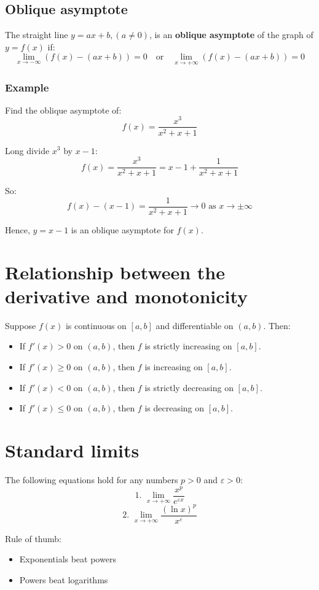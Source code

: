 \documentclass[11pt]{article}
\begin{document}
\newpage
\subsection{Oblique asymptote}
\label{sec:orgde6955f}
The straight line \(y = ax + b, (a \neq 0)\), is an \textbf{oblique asymptote} of the graph of \(y = f(x)\) if:
\[\lim_{x \rightarrow -\infty} (f(x) - (ax + b)) = 0 \quad \text{or} \quad \lim_{x \rightarrow +\infty} (f(x) - (ax + b)) = 0\]
\subsubsection{Example}
\label{sec:org05d23cc}
Find the oblique asymptote of:
\[f(x) = \frac{x^3}{x^2 + x + 1}\]

Long divide \(x^3\) by \(x - 1\):
\[f(x) = \frac{x^3}{x^2 + x + 1} = x - 1 + \frac{1}{x^2 + x + 1}\]

So:
\[f(x) - (x - 1) = \frac{1}{x^2 + x + 1} \rightarrow 0 \text{ as } x \rightarrow \pm \infty\]

Hence, \(y = x - 1\) is an oblique asymptote for \(f(x)\).
\section{Relationship between the derivative and monotonicity}
\label{sec:orgd80eaaf}
Suppose \(f(x)\) is continuous on \([a, b]\) and differentiable on \((a, b)\). Then:
\begin{itemize}
\item If \(f'(x) > 0\) on \((a, b)\), then \(f\) is strictly increasing on \([a, b]\).
\item If \(f'(x) \ge 0\) on \((a, b)\), then \(f\) is increasing on \([a, b]\).
\item If \(f'(x) < 0\) on \((a, b)\), then \(f\) is strictly decreasing on \([a, b]\).
\item If \(f'(x) \le 0\) on \((a, b)\), then \(f\) is decreasing on \([a, b]\).
\end{itemize}

\newpage
\section{Standard limits}
\label{sec:orge88b189}
The following equations hold for any numbers \(p > 0\) and \(\varepsilon > 0\):
\[\text{1. } \lim_{x \rightarrow +\infty} \frac{x^p}{e^{\varepsilon x}}\]
\[\text{2. } \lim_{x \rightarrow +\infty} \frac{(\ln x)^p}{x^{\varepsilon}}\]

Rule of thumb:
\begin{itemize}
\item Exponentials beat powers
\item Powers beat logarithms
\end{itemize}
\end{document}
